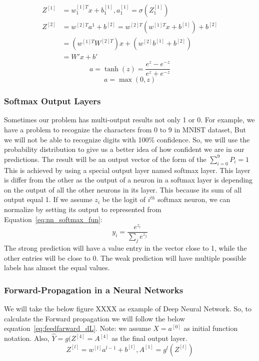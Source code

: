 \begin{subequations}\label{eq:linear_fun_limitations}
   \begin{align}
     Z^{[1]} & = w_1^{[1]T} x + b_1^{[1]} , a_1^{[1]} = \sigma(Z_1^{[1]}) \\
     Z^{[2]} & = w^{[2]T} a^1 + b^{[2]} = w^{[2]T} (w^{[1]T}x + b^{[1]}) + b^{[2]}\\
             & = (w^{[1]T}W^{[2]T})x + (w^{[2]}b^{[1]}+ b^{[2]})\\
             & = W' x + b'
\end{align}
\end{subequations}%
\begin{equation}\label{eq:nn_tanh}
  a = \tanh(z) =\frac{e^z-e^{-z}}{e^z+e^{-z}}
\end{equation}%
\begin{equation}\label{eq:nn_relu}
  a = \max(0,z)
\end{equation}%
\subsubsection{Softmax Output Layers}
Sometimes our problem has multi-output results not only 1 or 0. For example, we have a problem to recognize the characters from 0 to 9 in MNIST dataset, But we will not be able to recognize digits with 100\% confidence. So, we will use the probability distribution to give us a better idea of how confident we are in our predictions. The result will be an output vector of the form of the $\sum_{i = 0}^9P_i=1$
This is achieved by using a special output layer named softmax layer. This layer is differ from the other as the output of a neuron in a softmax layer is depending on the output of all the other neurons in its layer. This because its sum of all output equal 1. If we assume $z_i$ be the logit of $i^{th}$ softmax neuron, we can normalize by setting its output to represented from Equation~\eqref{eq:nn_softmax_fun}:%
\begin{equation}\label{eq:nn_softmax_fun}
  y_i=\frac{e^{z_i}}{\sum_je^{z_j}}
\end{equation}
The strong prediction will have a value entry in the vector close to 1, while the other entries will be close to 0. The weak prediction will have multiple possible labels has almost the equal values\cite{DLFundamentals}.
\subsubsection{Forward-Propagation in a Neural Networks}
We will take the below figure XXXX as example of Deep Neural Network. So, to calculate the Forward propagation we will follow the below equation~\eqref{eq:feedfarward_dL}. Note: we assume $X = a^{[0]}$ as initial function notation. Also, $\widehat{Y}= g(Z^{[4]}=A^{[4]}$ as the final output layer.%
\begin{equation}\label{eq:feedfarward_dL}
     Z^{[l]}  = w^{[l]} a^{l-1} + b^{[l]} , A^{[1]} = g^{l}(Z^{[l]})
   \end{equation} %
